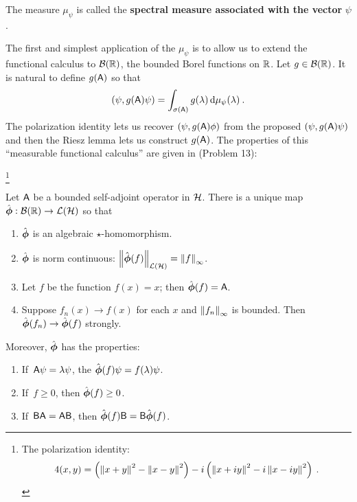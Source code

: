 \begin{definition}
    The measure $\mu_\psi$ is called the \textbf{spectral measure associated with the vector} $\psi$.
\end{definition}

The first and simplest application of the $\mu_\psi$ is to allow us to extend the functional calculus to $\mathcal B(\mathbb{R})$, the bounded Borel functions on $\mathbb{R}$. Let $g \in \mathcal B(\mathbb{R})$. It is natural to define $g(\mathsf{A})$ so that 
\begin{align}
    (\psi, g(\mathsf{A}) \psi) = \int_{\sigma (\mathsf{A})} g(\lambda) \, \mathrm{d} \mu_\psi (\lambda) \:.
\end{align}
The polarization identity lets us recover $(\psi, g(\mathsf{A}) \phi)$ from the proposed $(\psi, g(\mathsf{A}) \psi)$ and then the Riesz lemma lets us construct $g(\mathsf{A})$. The properties of this \enquote{measurable functional calculus} are given in (Problem 13):

\footnote{The polarization identity: \begin{align*}
    4 (x,y) = \left(\left \Vert x+y \right \Vert^2 - \left \Vert x-y \right \Vert^2 \right) - i \left(\left \Vert x+iy \right \Vert^2 - i \left \Vert x - iy \right \Vert^2 \right) \:.
\end{align*} }

\begin{theorem}
    Let $\mathsf{A}$ be a bounded self-adjoint operator in $\mathcal{H}$. There is a unique map $\hat {\boldsymbol{\phi}}: \mathcal B(\mathbb{R}) \to \mathcal L (\mathcal{H})$ so that \begin{enumerate}
        \item $\hat {\boldsymbol{\phi}}$ is an algebraic $\star$-homomorphism.
        \item $\hat {\boldsymbol{\phi}}$ is norm continuous: $\left \Vert \hat {\boldsymbol{\phi}} (f) \right \Vert_{\mathcal L(\mathcal{H})} = \left \Vert f \right \Vert_\infty$.
        \item Let $f$ be the function $f(x) = x $; then $\hat {\boldsymbol{\phi}}(f) = \mathsf{A}$.
        \item Suppose $f_n(x) \rightarrow f(x)$ for each $x$ and $\left \Vert f_n \right \Vert_\infty$ is bounded. Then $\hat {\boldsymbol{\phi}}(f_n) \rightarrow \hat {\boldsymbol{\phi}} (f)$ strongly.
    \end{enumerate}
    
    Moreover, $\hat {\boldsymbol{\phi}}$ has the properties:
    \begin{enumerate}
        \item If\, $\mathsf{A} \psi = \lambda \psi$, the $\hat {\boldsymbol{\phi}}(f) \psi = f(\lambda) \psi$.
        \item If\, $f \geq 0$, then $\hat {\boldsymbol{\phi}} (f) \geq 0$.
        \item If\, $\mathsf{B} \mathsf{A} = \mathsf{A} \mathsf{B}$, then $\hat {\boldsymbol{\phi}} (f) \mathsf{B} = \mathsf{B} \hat {\boldsymbol{\phi}}(f)$.
    \end{enumerate}
\end{theorem}

